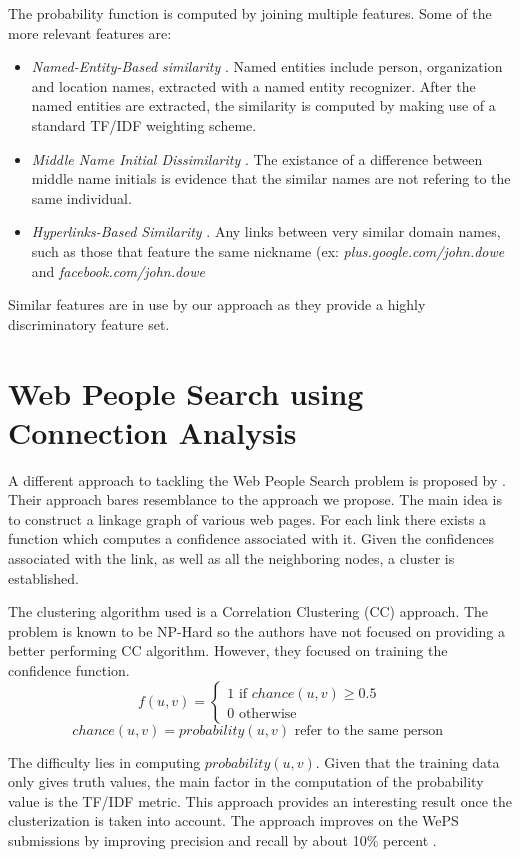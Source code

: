 The probability function is computed by joining multiple features. Some of the more
relevant features are:
\begin {itemize}
\item
   {\em Named-Entity-Based similarity \/}. Named entities include person, organization and location names,
   extracted with a named entity recognizer. After the named entities are extracted,
   the similarity is computed by making use of a standard TF/IDF weighting scheme.
\item
   {\em Middle Name Initial Dissimilarity \/}. The existance of a difference between
   middle name initials is evidence that the similar names are not refering to the same
   individual.
\item
   {\em Hyperlinks-Based Similarity \/}. Any links between very similar domain names,
   such as those that feature the same nickname (ex: {\em plus.google.com/john.dowe \/}
   and {\em facebook.com/john.dowe \/}
\end {itemize}

Similar features are in use by our approach as they provide a highly discriminatory
feature set.


\section{Web People Search using Connection Analysis}
A different approach to tackling the Web People Search problem is proposed by
\cite{connection-analysis}. Their approach bares resemblance to the approach
we propose. The main idea is to construct a linkage graph of various web pages.
For each link there exists a function which computes a confidence associated with
it. Given the confidences associated with the link, as well as all the neighboring
nodes, a cluster is established.

The clustering algorithm used is a Correlation Clustering (CC) approach.
\cite{correlation-clustering} The problem is known to be NP-Hard so the authors
have not focused on providing a better performing CC algorithm. However, they
focused on training the confidence function.
\[ f(u, v) =
    \left\{
        \begin{array}{ll}
            1 \mbox{ if } chance(u, v) \geq 0.5 \\
            0 \mbox{ otherwise}
        \end{array}
    \right.
\]
\[ chance(u, v) = probability(u,v) \mbox{ refer to the same person } \]

The difficulty lies in computing $ probability(u,v) $. Given that the training
data only gives truth values, the main factor in the computation of the
probability value is the TF/IDF metric. This approach provides an interesting
result once the clusterization is taken into account. The approach improves
on the WePS submissions by improving precision and recall by about 10\% percent
\cite{connection-analysis}.

